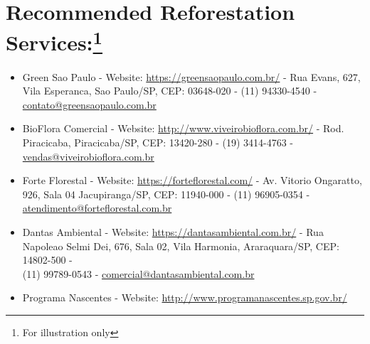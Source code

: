 \documentclass{article}
\begin{document}
    \section{Recommended Reforestation Services:\protect\footnote{For illustration only}}
    \begin{itemize}
        \item Green Sao Paulo - Website: \url{https://greensaopaulo.com.br/} - Rua Evans, 627, Vila Esperanca, Sao Paulo/SP, CEP: 03648-020 - (11) 94330-4540 - \href{mailto:contato@greensaopaulo.com.br}{contato@greensaopaulo.com.br}
        \item BioFlora Comercial - Website: \url{http://www.viveirobioflora.com.br/} - Rod. Piracicaba, Piracicaba/SP, CEP: 13420-280 - (19) 3414-4763 - \href{mailto:vendas@viveirobioflora.com.br}{vendas@viveirobioflora.com.br}
        \item Forte Florestal - Website: \url{https://forteflorestal.com/} - Av. Vitorio Ongaratto, 926, Sala 04 Jacupiranga/SP, CEP: 11940-000 -  (11) 96905-0354 - \href{mailto:atendimento@forteflorestal.com.br}{atendimento@forteflorestal.com.br}
        \item Dantas Ambiental - Website: \url{https://dantasambiental.com.br/} - Rua Napoleao Selmi Dei, 676, Sala 02, Vila Harmonia, Araraquara/SP, CEP: 14802-500 -\\ (11) 99789-0543 - \href{mailto:comercial@dantasambiental.com.br}{comercial@dantasambiental.com.br}
        \item Programa Nascentes - Website: \url{http://www.programanascentes.sp.gov.br/}


        
    \end{itemize}

    \vspace{25pt}


    
\end{document}
